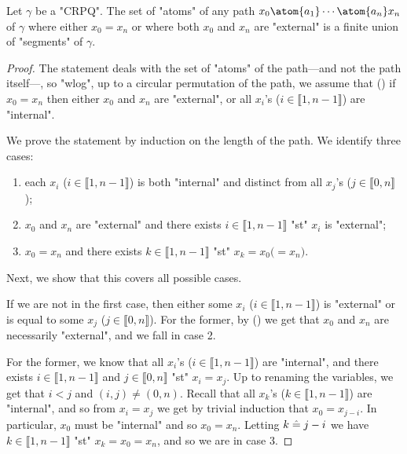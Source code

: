 \begin{proposition}
	\AP\label{prop:union-segments}
	Let $\gamma$ be a "CRPQ".
	The set of "atoms" of any path $x_0 \atom{a_1} \cdots \atom{a_n} x_n$ of $\gamma$
	where either $x_0 = x_n$ or where both $x_0$ and $x_n$ are "external" 
	is a finite union of "segments" of $\gamma$.
\end{proposition}
	
\begin{proof}
	The statement deals with the set of "atoms" of the path---and not the path itself---,
	so "wlog", up to a circular permutation of the path, we assume that ()
	if $x_0 = x_n$
	then either $x_0$ and $x_n$ are "external", or all $x_i$'s ($i \in \lBrack 1,n-1\rBrack$)
	are "internal".

	We prove the statement by induction on the length of the path.
	We identify three cases:
	\begin{enumerate}
		\item each $x_i$ ($i \in \lBrack 1,n-1 \rBrack$) is both
			"internal" and distinct from all $x_j$'s ($j\in \lBrack 0,n\rBrack$);
		\item $x_0$ and $x_n$ are "external" and there exists
			$i \in \lBrack 1,n-1 \rBrack$ "st" $x_i$ is "external";
		\item $x_0 = x_n$ and there exists $k \in \lBrack 1,n-1 \rBrack$
					"st" $x_k = x_0 \mathrel{(=} x_n)$.
	\end{enumerate}
	Next, we show that this covers all possible cases.

	If we are not in the first case, then either some
	$x_i$ ($i \in \lBrack 1,n-1 \rBrack$) is "external" or is equal to some $x_j$ ($j\in \lBrack 0,n\rBrack$). For the former, by () we get that $x_0$ and $x_n$ are necessarily
	"external", and we fall in case 2.
	
	For the former, we know that all $x_i$'s 
	($i \in \lBrack 1,n-1 \rBrack$) are "internal", and there exists $i \in \lBrack 1,n-1 \rBrack$
	and $j\in \lBrack 0,n\rBrack$ "st" $x_i = x_j$. Up to renaming the variables, we get 
	that $i<j$ and $(i,j) \neq (0,n)$. 
	Recall that all $x_k$'s ($k \in \lBrack 1,n-1 \rBrack$) are "internal",
	and so from $x_i = x_j$ we get by trivial induction that $x_0 = x_{j-i}$.
	In particular, $x_0$ must be "internal" and so $x_0 = x_n$.
	Letting $k \mathrel{\hat{=}} j-i$ we have $k \in \lBrack 1,n-1 \rBrack$ "st" 
	$x_k = x_0 = x_n$, and so we are in case 3.


\end{proof}
